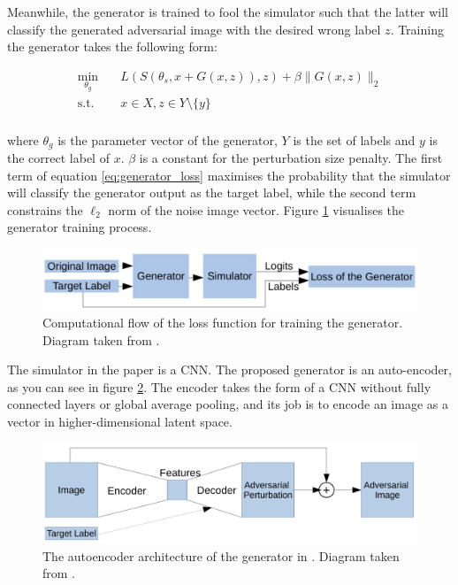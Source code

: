 Meanwhile, the generator is trained to fool the simulator such that the latter will classify the generated adversarial image with the desired wrong label $z$. Training the generator takes the following form:

\begin{equation}
\begin{aligned}
\min_{\theta_g} \quad & L(S(\theta_s, x + G(x, z)),z) + \beta\|G(x,z)\|_2\\
\textrm{s.t.} \quad & x \in X, z \in Y \setminus \{y\}\\
\label{eq:generator_loss}
\end{aligned}
\end{equation}

\noindent where $\theta_g$ is the parameter vector of the generator, $Y$ is the set of labels and $y$ is the correct label of $x$. $\beta$ is a constant for the perturbation size penalty. The first term of equation \ref{eq:generator_loss} maximises the probability that the simulator will classify the generator output as the target label, while the second term constrains the $\ell_2$ norm of the noise image vector.  Figure \ref{fig:zheng_generator_loss} visualises the generator training process.

\begin{figure}[h]
    \centering
    \includegraphics[width=1\textwidth]{graphics/generator_loss.JPG}
    \caption{Computational flow of the loss function for training the generator. Diagram taken from \cite{zheng_black_box_GAN}.}
    \label{fig:zheng_generator_loss}
\end{figure}

The simulator in the paper is a CNN. The proposed generator is an auto-encoder, as you can see in figure \ref{fig:zheng_generator}. The encoder takes the form of a CNN without fully connected layers or global average pooling, and its job is to encode an image as a vector in higher-dimensional latent space. 

\begin{figure}[h]
    \centering
    \includegraphics[width=1\textwidth]{graphics/generator.JPG}
    \caption{The autoencoder architecture of the generator in \cite{zheng_black_box_GAN}. Diagram taken from \cite{zheng_black_box_GAN}.}
    \label{fig:zheng_generator}
\end{figure}

